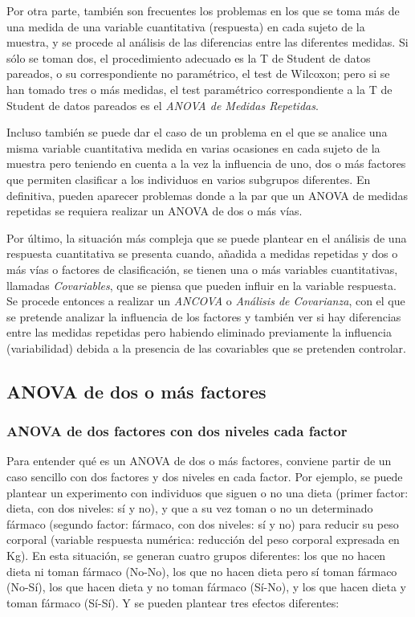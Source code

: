 Por otra parte, también son frecuentes los problemas en los que se toma más de una medida de una variable cuantitativa (respuesta) en cada
sujeto de la muestra, y se procede al análisis de las diferencias entre las diferentes medidas. Si sólo se toman dos, el procedimiento
adecuado es la T de Student de datos pareados, o su correspondiente no paramétrico, el test de Wilcoxon; pero si se han tomado tres o más
medidas, el test paramétrico correspondiente a la T de Student de datos pareados es el \emph{ANOVA de Medidas Repetidas}.

Incluso también se puede dar el caso de un problema en el que se analice una misma variable cuantitativa medida en varias ocasiones en cada
sujeto de la muestra pero teniendo en cuenta a la vez la influencia de uno, dos o más factores que permiten clasificar a los individuos en
varios subgrupos diferentes. En definitiva, pueden aparecer problemas donde a la par que un ANOVA de medidas repetidas se requiera realizar
un ANOVA de dos o más vías.

Por último, la situación más compleja que se puede plantear en el análisis de una respuesta cuantitativa se presenta cuando, añadida a
medidas repetidas y dos o más vías o factores de clasificación, se tienen una o más variables cuantitativas, llamadas \emph{Covariables},
que se piensa que pueden influir en la variable respuesta. Se procede entonces a realizar un \emph{ANCOVA} o \emph{Análisis de Covarianza},
con el que se pretende analizar la influencia de los factores y también ver si hay diferencias entre las medidas repetidas pero habiendo
eliminado previamente la influencia (variabilidad) debida a la presencia de las covariables que se pretenden controlar.


\subsection{ANOVA de dos o más factores}

\subsubsection{ANOVA de dos factores con dos niveles cada factor}

Para entender qué es un ANOVA de dos o más factores, conviene partir de un caso sencillo con dos factores y dos niveles en cada factor. Por
ejemplo, se puede plantear un experimento con individuos que siguen o no una dieta (primer factor: dieta, con dos niveles: sí y no), y que a
su vez toman o no un determinado fármaco (segundo factor: fármaco, con dos niveles: sí y no) para reducir su peso corporal (variable
respuesta numérica: reducción del peso corporal expresada en Kg). En esta situación, se generan cuatro grupos diferentes: los que no hacen
dieta ni toman fármaco (No-No), los que no hacen dieta pero sí toman fármaco (No-Sí), los que hacen dieta y no toman fármaco (Sí-No), y los
que hacen dieta y toman fármaco (Sí-Sí). Y se pueden plantear tres efectos diferentes:


